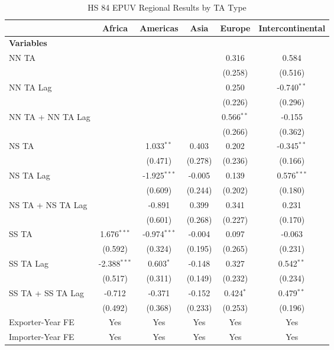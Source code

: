 \begin{table}[htbp]
    \centering
    \caption{HS 84 EPUV Regional Results by TA Type}
    \label{tab:84_pta_types}
    \begin{adjustbox}{max width=\textwidth}
    \begin{tabular}{lccccc}
    \hline
     & \multicolumn{1}{c}{Africa} & \multicolumn{1}{c}{Americas} & \multicolumn{1}{c}{Asia} & \multicolumn{1}{c}{Europe} & \multicolumn{1}{c}{Intercontinental} \\
    \hline
    \textbf{Variables} &  &  &  &  &  \\
    \hline
    NN TA &  &  &  & 0.316 & 0.584 \\
     &  &  &  & (0.258) & (0.516) \\
    NN TA Lag &  &  &  & 0.250 & -0.740$^{\ast\ast}$ \\
     &  &  &  & (0.226) & (0.296) \\
    NN TA + NN TA Lag &  &  &  & 0.566$^{\ast\ast}$ & -0.155 \\
     &  &  &  & (0.266) & (0.362) \\
    \hline
    NS TA &  & 1.033$^{\ast\ast}$ & 0.403 & 0.202 & -0.345$^{\ast\ast}$ \\
     &  & (0.471) & (0.278) & (0.236) & (0.166) \\
    NS TA Lag &  & -1.925$^{\ast\ast\ast}$ & -0.005 & 0.139 & 0.576$^{\ast\ast\ast}$ \\
     &  & (0.609) & (0.244) & (0.202) & (0.180) \\
    NS TA + NS TA Lag &  & -0.891 & 0.399 & 0.341 & 0.231 \\
     &  & (0.601) & (0.268) & (0.227) & (0.170) \\
    \hline
    SS TA & 1.676$^{\ast\ast\ast}$ & -0.974$^{\ast\ast\ast}$ & -0.004 & 0.097 & -0.063 \\
     & (0.592) & (0.324) & (0.195) & (0.265) & (0.231) \\
    SS TA Lag & -2.388$^{\ast\ast\ast}$ & 0.603$^{\ast}$ & -0.148 & 0.327 & 0.542$^{\ast\ast}$ \\
     & (0.517) & (0.311) & (0.149) & (0.232) & (0.234) \\
    SS TA + SS TA Lag & -0.712 & -0.371 & -0.152 & 0.424$^{\ast}$ & 0.479$^{\ast\ast}$ \\
     & (0.492) & (0.368) & (0.233) & (0.253) & (0.196) \\
    \hline
    Exporter-Year FE & Yes & Yes & Yes & Yes & Yes \\
    Importer-Year FE & Yes & Yes & Yes & Yes & Yes \\

\end{tabular}
\end{adjustbox}
\end{table}
